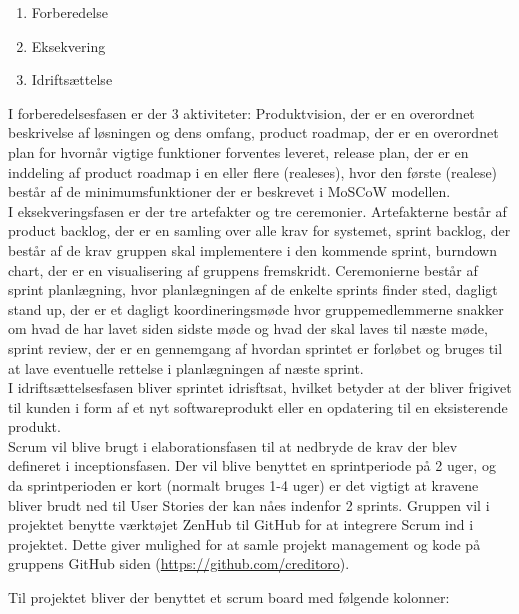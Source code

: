 \begin{enumerate}
    \item Forberedelse
    \item Eksekvering
    \item Idriftsættelse
\end{enumerate}

\noindent
I forberedelsesfasen er der 3 aktiviteter: Produktvision, der er en overordnet beskrivelse af løsningen og dens omfang, product roadmap, der er en overordnet plan for hvornår vigtige funktioner forventes leveret, release plan, der er en inddeling af product roadmap i en eller flere (realeses), hvor den første (realese) består af de minimumsfunktioner der er beskrevet i MoSCoW modellen.\\

\noindent
I eksekveringsfasen er der tre artefakter og tre ceremonier. Artefakterne består af product backlog, der er en samling over alle krav for systemet, sprint backlog, der består af de krav gruppen skal implementere i den kommende sprint, burndown chart, der er en visualisering af gruppens fremskridt. Ceremonierne består af sprint planlægning, hvor planlægningen af de enkelte sprints finder sted, dagligt stand up, der er et dagligt koordineringsmøde hvor gruppemedlemmerne snakker om hvad de har lavet siden sidste møde og hvad der skal laves til næste møde, sprint review, der er en gennemgang af hvordan sprintet er forløbet og bruges til at lave eventuelle rettelse i planlægningen af næste sprint. \\

\noindent
I idriftsættelsesfasen bliver sprintet idrisftsat, hvilket betyder at der bliver frigivet til kunden i form af et nyt softwareprodukt eller en opdatering til en eksisterende produkt.\\

\noindent
Scrum vil blive brugt i elaborationsfasen til at nedbryde de krav der blev defineret i inceptionsfasen. Der vil blive benyttet en sprintperiode på 2 uger, og da sprintperioden er kort (normalt bruges 1-4 uger) er det vigtigt at kravene bliver brudt ned til User Stories der kan nåes indenfor 2 sprints.
Gruppen vil i projektet benytte værktøjet ZenHub til GitHub for at integrere Scrum ind i projektet. Dette giver mulighed for at samle projekt management og kode på gruppens GitHub siden (\url{https://github.com/creditoro}).

\noindent
Til projektet bliver der benyttet et scrum board med følgende kolonner:\\

